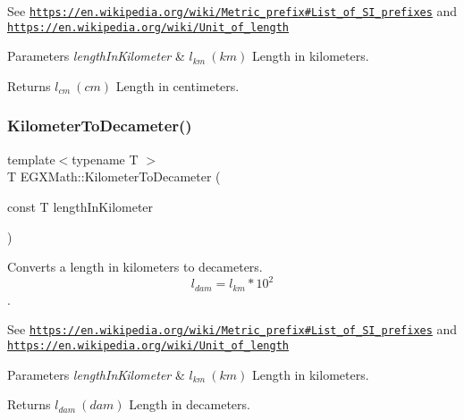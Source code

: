 See \href{https://en.wikipedia.org/wiki/Metric_prefix#List_of_SI_prefixes}{\tt https\+://en.\+wikipedia.\+org/wiki/\+Metric\+\_\+prefix\#\+List\+\_\+of\+\_\+\+S\+I\+\_\+prefixes} and \href{https://en.wikipedia.org/wiki/Unit_of_length}{\tt https\+://en.\+wikipedia.\+org/wiki/\+Unit\+\_\+of\+\_\+length} 
\begin{DoxyParams}{Parameters}
{\em length\+In\+Kilometer} & $ l_{km}\ (km)$ Length in kilometers. \\
\hline
\end{DoxyParams}
\begin{DoxyReturn}{Returns}
$ l_{cm}\ (cm)$ Length in centimeters. 
\end{DoxyReturn}
\mbox{\label{group___e_g_x_math-_conversions-_length_conversions-_kilometer-_s_i_ga040acc3477237c471c0336e5b44d4654}} 
\subsubsection{\texorpdfstring{Kilometer\+To\+Decameter()}{KilometerToDecameter()}}
{\footnotesize\ttfamily template$<$typename T $>$ \\
T E\+G\+X\+Math\+::\+Kilometer\+To\+Decameter (\begin{DoxyParamCaption}\item[{const T}]{length\+In\+Kilometer }\end{DoxyParamCaption})}



Converts a length in kilometers to decameters. \[ l_{dam}=l_{km} * 10^{2} \]. 

See \href{https://en.wikipedia.org/wiki/Metric_prefix#List_of_SI_prefixes}{\tt https\+://en.\+wikipedia.\+org/wiki/\+Metric\+\_\+prefix\#\+List\+\_\+of\+\_\+\+S\+I\+\_\+prefixes} and \href{https://en.wikipedia.org/wiki/Unit_of_length}{\tt https\+://en.\+wikipedia.\+org/wiki/\+Unit\+\_\+of\+\_\+length} 
\begin{DoxyParams}{Parameters}
{\em length\+In\+Kilometer} & $ l_{km}\ (km)$ Length in kilometers. \\
\hline
\end{DoxyParams}
\begin{DoxyReturn}{Returns}
$ l_{dam}\ (dam)$ Length in decameters. 
\end{DoxyReturn}
\mbox{\label{group___e_g_x_math-_conversions-_length_conversions-_kilometer-_s_i_ga6b9e471fb53794741dcf3859d316b1c1}} 
